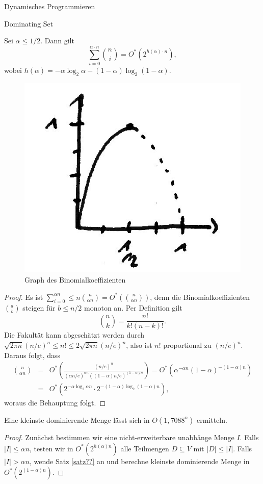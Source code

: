 \begin{chapter}{Dynamisches Programmieren}
\begin{section}{Dominating Set}
  \begin{lemma}
    Sei \(\alpha \leq 1/2\). Dann gilt \[ \sum_{i=0}^{\alpha \cdot n} \binom{n}{i} = O^*( 2^{h(\alpha) \cdot n} ), \] wobei \(h(\alpha) = - \alpha \log_2 \alpha - (1-\alpha) \log_2(1 - \alpha)\).
  \end{lemma}
  
  \begin{figure}[h]
    \centering
    \includegraphics[width=.25\textwidth]{./Bilder/b01.jpg}
    \caption{Graph des Binomialkoeffizienten}
  \end{figure}
  
  \begin{proof}
    Es ist \( \sum_{i=0}^{\alpha n} \leq n \binom{n}{\alpha n} = O^*( \binom{n}{\alpha n} ) \), denn die Binomialkoeffizienten \( \binom{a}{b} \) steigen für \(b \leq n/2\) monoton an. Per Definition gilt 
    \[
      \binom{n}{k} = \frac{n!}{k! (n-k)!}.
    \]
    Die Fakultät kann abgeschätzt werden durch \( \sqrt{2 \pi n} (n/e)^n \leq n! \leq 2 \sqrt{2 \pi n} (n/e)^n \), also ist \(n!\) proportional zu \((n/e)^n\). Daraus folgt, dass 
    \begin{eqnarray*}
      \binom{n}{\alpha n} &=& O^* \left( \frac{(n/e)^n}{(\alpha n/e)^{\alpha n} ( (1-\alpha)n/e)^{(1-\alpha) n}} \right) = O^* \left( \alpha^{-\alpha n} (1-\alpha)^{-(1-\alpha)n} \right) \\
      &=& O^* \left( 2^{-\alpha \log_2 \alpha n} \cdot 2^{-(1 - \alpha) \log_2(1-\alpha)n} \right),
    \end{eqnarray*}
    woraus die Behauptung folgt.
  \end{proof}
  
  \begin{theorem}
    Eine kleinste dominierende Menge lässt sich in \(O(1{,}7088^n)\) ermitteln.
  \end{theorem}
  
  \begin{proof}
    Zunächst bestimmen wir eine nicht-erweiterbare unabhänge Menge \(I\). 
    Falls \(|I| \leq \alpha n\), testen wir in \(O^*(2^{h(\alpha) n})\) alle Teilmengen \(D \subseteq V\) mit \(|D| \leq |I|\).
    Falls \(|I| > \alpha n\), wende Satz \ref{satz??} an und berechne kleinste dominierende Menge in \(O^*(2^{(1-\alpha)n})\). %
    

\end{proof}
\end{section}
\end{chapter}

